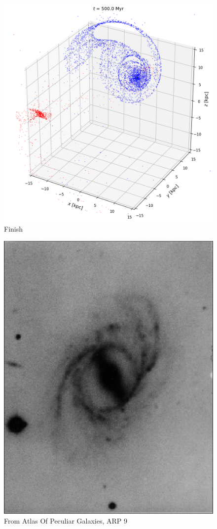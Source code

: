 \documentclass[linenumbers,RNAAS,trackchanges]{aastex631}
\begin{document}
\begin{figure}[H]
    \centering
    \includegraphics[scale=.40]{comparison_galaxy/ARP_9_output.png}
    \caption{Finish}
    \label{fig:code}
\end{figure}
\begin{figure}[H]
    \centering
    \includegraphics[scale=.50]{comparison_galaxy/arp_9.png}
    \caption{From Atlas Of Peculiar Galaxies, ARP 9}
    \label{fig:code}
\end{figure}
\end{document}
